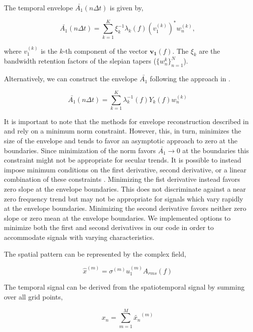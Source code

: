 \documentclass[phd,tocprelim]{cornell}
\begin{document}
The temporal envelope $\bar{A_1}(n \Delta t)$ is given by,

\begin{equation}
\label{mann:env}
\bar{A_1}(n \Delta t) = \sum_{k=1}^{K} \xi_{k}^{-1} \lambda_{k}(f)(v_{1}^{(k)})^{*}w_{n}^{(k)},
\end{equation}

where $v_{1}^{(k)}$ is the $k$-th component of the vector 
$\mathbf{v_{1}}(f)$. The $\xi_{k}$ are the bandwidth retention 
factors of the slepian tapers ($\{w_{n}^{k}\}_{n=1}^{N}$). 

Alternatively, we can construct the envelope $\bar{A_1}$ following 
the approach in \cite{park1992envelope}.

\begin{equation}
\label{park:env}
\bar{A_1}(n \Delta t) = \sum_{k=1}^{K} \lambda_k^{-1}(f) Y_k(f) w_n^{(k)}
\end{equation}

It is important to note that the methods for envelope reconstruction 
described in  and  rely on a minimum 
norm constraint. However, this, in turn, minimizes the size of the 
envelope and tends to favor an asymptotic approach to zero at the 
boundaries. Since minimization of the norm favors $\bar{A_1}\rightarrow 0$ 
at the boundaries this constraint might not be appropriate for secular 
trends. It is possible to instead impose minimum conditions on the first 
derivative, second derivative, or a linear combination of these constraints 
\cite{mann1999oscillatory}. Minimizing the fist derivative instead favors 
zero slope at the envelope boundaries. This does not discriminate against 
a near zero frequency trend but may not be appropriate for signals which 
vary rapidly at the envelope boundaries. Minimizing the second derivative 
favors neither zero slope or zero mean at the envelope boundaries. We 
implemented options to minimize both the first and second derivatives in 
our code in order to accommodate signals with varying characteristics. 

The spatial pattern can be represented
by the complex field,

\begin{equation}
\hat{x}^{(m)}=\sigma^{(m)}u_{1}^{(m)}A_{rms}(f)
\label{eofs}
\end{equation}

The temporal signal can be derived from the spatiotemporal signal 
by summing over all grid points,

\begin{equation}
x_{n} = \sum_{m=1}^{M} \tilde{x_{n}}^{(m)}
\end{equation}
\end{document}
